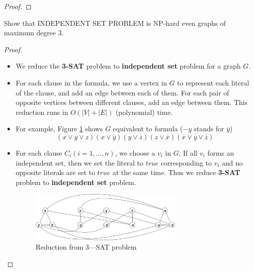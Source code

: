 \documentclass{article}
\newcounter{exercise}
\newcommand{\<}{
    \langle}
\renewcommand{\>}{
    \rangle}
\begin{document}
{\begin{proof}
\end{proof}
\newpage

\begin{exercise}
Show that \textsf{INDEPENDENT SET PROBLEM} is NP-hard even graphs of maximum degree $3$.
\end{exercise}
\begin{proof}
    \leavevmode\newline
    \begin{itemize}
        \item We reduce the \textbf{3-SAT} problem to \textbf{independent set} problem for a graph $G$.
        \item For each clause in the formula, we use a vertex in $G$ to represent each literal of the clause, and add an edge between each of them. For each pair of opposite vertices between different clauses, add an edge between them. This reduction runs in $O(|V|+|E|)$ (polynomial) time.
        \item For example, Figure \ref{fig:eee} shows $G$ equivalent to formula ($-y$ stands for $\overline{y}$)
        \begin{displaymath}
            (x\vee y \vee z)(x \vee \overline{y})(y \vee \overline{z})(z \vee \overline{x})(\overline{x} \vee \overline{y} \vee \overline{z})
        \end{displaymath}
        \item For each clause $C_i(i=1,\ldots,n)$, we choose a $v_i$ in $G$. If all $v_i$ forms an independent set, then we set the literal to $true$ corresponding to $v_i$ and no opposite literals are set to $true$ at the same time. Thus we reduce \textbf{3-SAT} problem to \textbf{independent set} problem. 

\begin{figure}[!htp]
    \centering
    \includegraphics[width=0.7\textwidth]{img/5.jpg}
    \caption{Reduction from 3—SAT problem}
    \label{fig:eee}
\end{figure}


\end{itemize}
\end{proof}}
\end{document}
